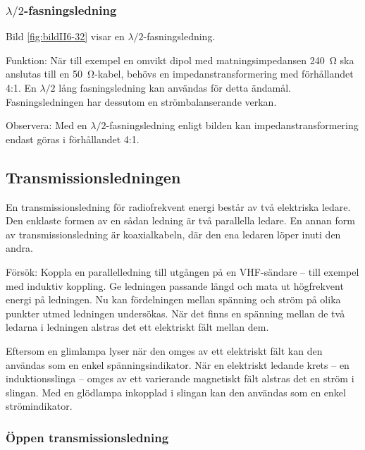 \subsubsection{$\lambda/2$-fasningsledning}


Bild \ref{fig:bildII6-32} visar en $\lambda/2$-fasningsledning.

Funktion: När till exempel en omvikt dipol med matningsimpedansen \SI{240}{\ohm}
ska anslutas till en \SI{50}{\ohm}-kabel, behövs en impedanstransformering med
förhållandet 4:1.
En \(\lambda/2\) lång fasningsledning kan användas för detta ändamål.
Fasningsledningen har dessutom en strömbalanserande verkan.

Observera: Med en \(\lambda/2\)-fasningsledning enligt bilden kan
impedanstransformering endast göras i förhållandet 4:1.

\subsection{Transmissionsledningen}

En transmissionsledning för radiofrekvent energi består av två elektriska
ledare.
Den enklaste formen av en sådan ledning är två parallella ledare.
En annan form av transmissionsledning är koaxialkabeln, där den ena ledaren
löper inuti den andra.

Försök: Koppla en parallelledning till utgången på en VHF-sändare --
till exempel med induktiv koppling.
Ge ledningen passande längd och mata ut högfrekvent energi på ledningen.
Nu kan fördelningen mellan spänning och ström på olika punkter utmed ledningen
undersökas.
När det finns en spänning mellan de två ledarna i ledningen alstras det ett
elektriskt fält mellan dem.

Eftersom en glimlampa lyser när den omges av ett elektriskt fält kan den
användas som en enkel spänningsindikator.
När en elektriskt ledande krets -- en induktionsslinga -- omges av ett
varierande magnetiskt fält alstras det en ström i slingan.
Med en glödlampa inkopplad i slingan kan den användas som en enkel
strömindikator.

\subsubsection{Öppen transmissionsledning}

